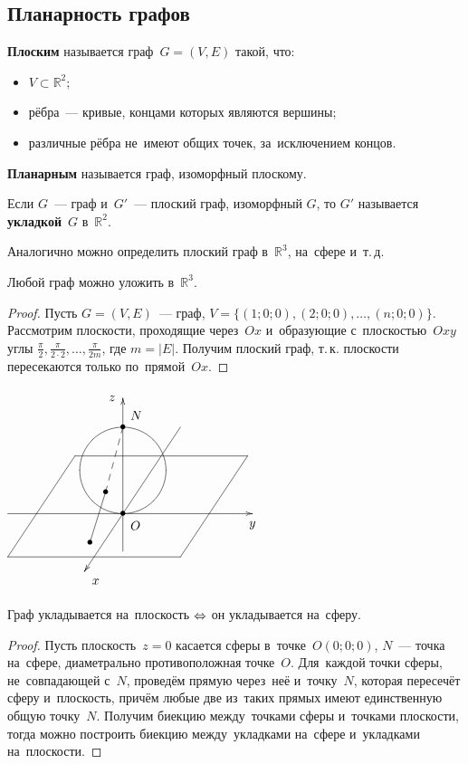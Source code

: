 \subsection{Планарность графов}
\textbf{Плоским} называется граф~$G = (V, E)$ такой, что:
\begin{itemize}
	\item $V \subset \mathbb R^2$;
	\item рёбра~--- кривые, концами которых являются вершины;
	\item различные рёбра не~имеют общих точек, за~исключением концов.
\end{itemize}

\textbf{Планарным} называется граф, изоморфный плоскому.

Если $G$~--- граф и~$G'$~--- плоский граф, изоморфный $G$, то $G'$ называется \textbf{укладкой}~$G$ в~$\mathbb R^2$.

Аналогично можно определить плоский граф в~$\mathbb R^3$, на~сфере и~т.\,д.

\begin{theorem}
Любой граф можно уложить в~$\mathbb R^3$.
\end{theorem}
\begin{proof}
Пусть $G = (V, E)$~--- граф, $V = \{ (1; 0; 0), (2; 0; 0), \ldots, (n; 0; 0) \}$.
Рассмотрим плоскости, проходящие через~$Ox$ и~образующие с~плоскостью~$Oxy$ углы
$\displaystyle \frac\pi2, \frac\pi{2\cdot2}, \ldots, \frac\pi{2m}$, где $m = |E|$.
Получим плоский граф, т.\,к. плоскости пересекаются только по~прямой~$Ox$.
\end{proof}

\begin{floatingfigure}{71mm}
\noindent
$\begin{xy} /r8mm/:
(-4, 0); (4.5, 0) **@{-} *@{>} *++!U{y}; %
(0, -1.3); (0, 4) **@{-} *@{>} *++!R{z}; %
(2, 3); (-1.3333, -2) **@{-} *@{>} *++!LU{x}; %
(-4, -1.5) = "1"; (2, -1.5) = "2" **@{-};
(2.3333, 3.5) = "off";
"1"; "1"+"off" = "3" **@{-};
"2"; "2"+"off" = "4" **@{-};
"3"; "4" **@{-};
(0, 1.5) *\cir<12mm>{};
(0, 0) *{\bullet} *++!LU{O};
(0, 3) *{\bullet} *++!DL{N};
(-0.6, 0.75) = "sph" **@{--} *{\bullet};
"sph"; (-1.1467, -1) **@{-} *{\bullet};
\end{xy}$
\end{floatingfigure}
\begin{theorem}
Граф укладывается на~плоскость $\opbr\Leftrightarrow$ он укладывается на~сферу.
\end{theorem}
\begin{proof}
Пусть плоскость~$z = 0$ касается сферы в~точке~$O(0; 0; 0)$, $N$~--- точка на~сфере, диаметрально противоположная точке~$O$.
Для~каждой точки сферы, не~совпадающей с~$N$, проведём прямую через~неё и~точку~$N$, которая пересечёт сферу и~плоскость, причём любые две из~таких прямых имеют единственную общую точку~$N$.
Получим биекцию между~точками сферы и~точками плоскости, тогда можно построить биекцию между~укладками на~сфере и~укладками на~плоскости.
\end{proof}

